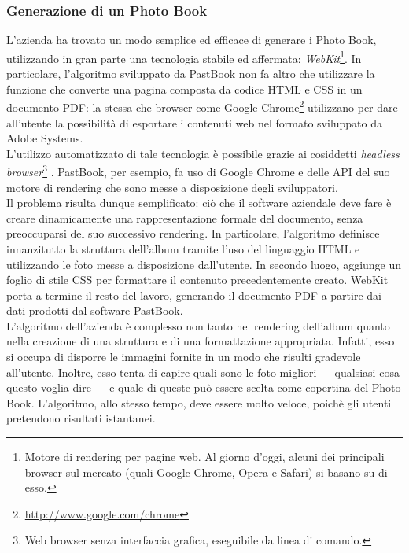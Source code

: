 			\subsubsection{Generazione di un Photo Book}
				L'azienda ha trovato un modo semplice ed efficace di generare i Photo Book, utilizzando in gran parte una tecnologia
				stabile ed affermata: \emph{WebKit}\footnote{Motore di rendering per pagine web. Al giorno d'oggi, alcuni dei principali browser sul mercato (quali Google Chrome, Opera e Safari) si
basano su di esso.}. In particolare, l'algoritmo sviluppato da
				PastBook non fa altro che utilizzare la funzione che converte una pagina composta da codice HTML e CSS in un
				documento PDF: la stessa che browser come Google Chrome\footnote{\url{http://www.google.com/chrome}} utilizzano per dare
				all'utente la possibilità di esportare i contenuti web nel formato sviluppato da Adobe Systems.\\
				L'utilizzo automatizzato di tale tecnologia è possibile grazie ai cosiddetti
				\emph{headless browser}\footnote{Web browser senza interfaccia grafica, eseguibile da linea di comando.} . PastBook, per esempio, fa uso di Google Chrome
				e delle API del suo motore di rendering che sono messe a disposizione degli sviluppatori.\\
				Il problema risulta dunque semplificato: ciò che il software aziendale deve fare è creare dinamicamente una
				rappresentazione formale del documento, senza preoccuparsi del suo successivo rendering. In particolare, l'algoritmo
				definisce innanzitutto la struttura dell'album tramite l'uso del linguaggio HTML e utilizzando le foto messe a
				disposizione dall'utente. In secondo luogo, aggiunge un foglio di stile CSS per formattare il contenuto
				precedentemente creato. WebKit porta a termine il resto del lavoro, generando il documento PDF a partire dai dati
				prodotti dal software PastBook.\\
				L'algoritmo dell'azienda è complesso non tanto nel rendering dell'album quanto nella creazione di una struttura e di
				una formattazione appropriata. Infatti, esso si occupa di disporre le immagini fornite in un modo che risulti
				gradevole all'utente. Inoltre, esso tenta di capire quali sono le foto migliori — qualsiasi cosa questo voglia dire —
				e quale di queste può essere scelta come copertina del Photo Book. L'algoritmo, allo stesso tempo, deve essere molto
				veloce, poichè gli utenti pretendono risultati istantanei.
